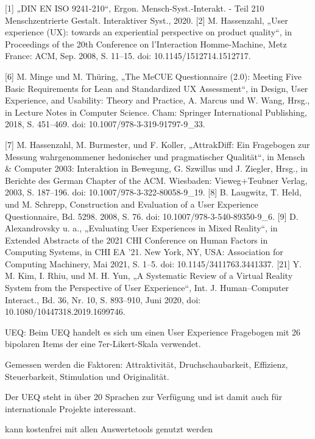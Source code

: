 [1]	„DIN EN ISO 9241-210“, Ergon. Mensch-Syst.-Interakt. - Teil 210 Menschzentrierte Gestalt. Interaktiver Syst., 2020.
[2]	M. Hassenzahl, „User experience (UX): towards an experiential perspective on product quality“, in Proceedings of the 20th Conference on l’Interaction Homme-Machine, Metz France: ACM, Sep. 2008, S. 11–15. doi: 10.1145/1512714.1512717.

[6] M. Minge und M. Thüring, „The MeCUE Questionnaire (2.0): Meeting Five Basic Requirements for Lean and Standardized UX Assessment“, in Design, User Experience, and Usability: Theory and Practice, A. Marcus und W. Wang, Hrsg., in Lecture Notes in Computer Science. Cham: Springer International Publishing, 2018, S. 451–469. doi: 10.1007/978-3-319-91797-9\_33.

[7]	M. Hassenzahl, M. Burmester, und F. Koller, „AttrakDiff: Ein Fragebogen zur Messung wahrgenommener hedonischer und pragmatischer Qualität“, in Mensch \& Computer 2003: Interaktion in Bewegung, G. Szwillus und J. Ziegler, Hrsg., in Berichte des German Chapter of the ACM. Wiesbaden: Vieweg+Teubner Verlag, 2003, S. 187–196. doi: 10.1007/978-3-322-80058-9\_19.
[8]	B. Laugwitz, T. Held, und M. Schrepp, Construction and Evaluation of a User Experience Questionnaire, Bd. 5298. 2008, S. 76. doi: 10.1007/978-3-540-89350-9\_6.
[9]	D. Alexandrovsky u. a., „Evaluating User Experiences in Mixed Reality“, in Extended Abstracts of the 2021 CHI Conference on Human Factors in Computing Systems, in CHI EA ’21. New York, NY, USA: Association for Computing Machinery, Mai 2021, S. 1–5. doi: 10.1145/3411763.3441337.
[21] Y. M. Kim, I. Rhiu, und M. H. Yun, „A Systematic Review of a Virtual Reality System from the Perspective of User Experience“, Int. J. Human–Computer Interact., Bd. 36, Nr. 10, S. 893–910, Juni 2020, doi: 10.1080/10447318.2019.1699746.

UEQ: 
Beim UEQ handelt es sich um einen User Experience Fragebogen mit 26 bipolaren Items der eine 7er-Likert-Skala verwendet.

Gemessen werden die Faktoren: Attraktivität, Druchschaubarkeit, Effizienz, Steuerbarkeit, Stimulation und Originalität. 

Der UEQ steht in über 20 Sprachen zur Verfügung und ist damit auch für internationale Projekte interessant. 

kann kostenfrei mit allen Auswertetools genutzt werden

